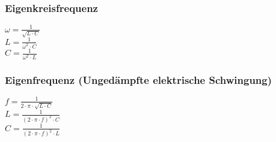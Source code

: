 \subsubsection{Eigenkreisfrequenz} 
\begin{minipage}{0.45\textwidth} 
$ \omega  = \frac{ 1}{\sqrt{L\cdot C}} $\\ 
$ L= \frac{ 1}{\omega ^{2} \cdot C} $\\ 
$ C = \frac{ 1}{\omega ^{2} \cdot L} $\\ 
\end{minipage} 
\begin{minipage}{0.45\textwidth} 
 
\end{minipage} 
\subsubsection{Eigenfrequenz (Ungedämpfte elektrische Schwingung)} 
\begin{minipage}{0.45\textwidth} 
$ f = \frac{ 1}{2\cdot \pi \cdot \sqrt{L\cdot C}} $\\ 
$ L = \frac{ 1}{(2\cdot \pi \cdot f)^{2} \cdot C} $\\ 
$ C = \frac{ 1}{(2\cdot \pi \cdot f)^{2} \cdot L} $\\ 
\end{minipage} 
\begin{minipage}{0.45\textwidth} 
 
\end{minipage} 

